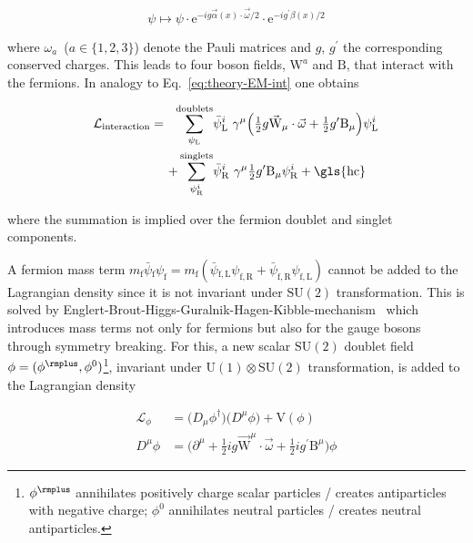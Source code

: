 \begin{equation}
\psi\mapsto\psi\cdot\mathrm{e}^{-ig\vec{\alpha}(x)\cdot\vec{\omega}/2}\cdot\mathrm{e}^{-ig^{\prime}\beta(x)/2} \label{eq:theory-u1su2-transformation}
\end{equation}

where $\omega_{a}$~($a\in\{1,2,3\}$) denote the Pauli matrices and $g$, $g^{\prime}$ the corresponding conserved charges. This leads to four boson fields, $\mathrm{W}^{a}$ and $\mathrm{B}$, that interact with the fermions. In analogy to Eq.~\ref{eq:theory-EM-int} one obtains

\begin{align}
\mathcal{L}_\mathrm{interaction}=~~\sum_{\psi_\mathrm{L}}^\mathrm{doublets}&\bar{\psi}^{i}_\mathrm{L}~\gamma^{\mu}\Big(\tfrac{1}{2}g\vec{\mathrm{W}}_{\mu}\cdot\vec{\omega}+\tfrac{1}{2}g^{\prime}\mathrm{B}_{\mu}\Big)\psi^{i}_\mathrm{L} \nonumber\\
+\sum_{\psi^{i}_\mathrm{R}}^\mathrm{singlets}&\bar{\psi}^{i}_\mathrm{R}~\gamma^{\mu}\tfrac{1}{2}g^{\prime}\mathrm{B}_{\mu}\psi^{i}_\mathrm{R} + \mathrm{\gls{hc}} \label{eq:theory-codev-su2-interaction}
\end{align}

where the summation is implied over the fermion doublet and singlet components.

A fermion mass term $ m_\mathrm{f}\bar{\psi}{}_\mathrm{f}\psi_\mathrm{f}=m_\mathrm{f}(\bar{\psi}{}_\mathrm{f,L}\psi_\mathrm{f,R}+\bar{\psi}_\mathrm{f,R}\psi_\mathrm{f,L})$ cannot be added to the Lagrangian density since it is not invariant under $\mathrm{SU(2)}$ transformation. This is solved by Englert-Brout-Higgs-Guralnik-Hagen-Kibble-mechanism~\cite{HIGGS1964132,PhysRevLett.13.508,PhysRevLett.13.321,PhysRevLett.13.585} which introduces mass terms not only for fermions but also for the gauge bosons through symmetry breaking. For this, a new scalar $\mathrm{SU(2)}$ doublet field $\phi=(\phi^{\rmplus},\phi^{0})$\footnote{$\phi^{\rmplus}$ annihilates positively charge scalar particles / creates antiparticles with negative charge; $\phi^{0}$ annihilates neutral particles / creates neutral antiparticles.}, invariant under $\mathrm{U(1)}\otimes\mathrm{SU(2)}$ transformation, is added to the Lagrangian density

\begin{subequations}
\begin{align}
\mathcal{L}_{\phi}&=\big(D_{\mu}\phi^{\dagger}\big)\big(D^{\mu}\phi\big)+\mathrm{V}(\phi) \label{eq:theory-phi-propagator} \\
D^{\mu}\phi&=\big(\partial^{\mu}+\tfrac{1}{2}ig\vec{\mathrm{W}}^{\mu}\cdot\vec{\omega}+\tfrac{1}{2}ig^{\prime}\mathrm{B}^{\mu}\big)\phi \label{eq:theory-phi-codev}
\end{align}
\end{subequations}

